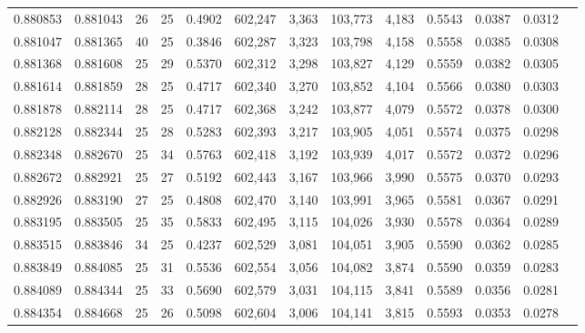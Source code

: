 \begin{tabular}{rrrrrrrrrrrrr}
0.880853 & 0.881043 &    26 &  25 &                                     0.4902 & 602,247 &   3,363 & 103,773 &   4,183 & 0.5543 & 0.0387 & 0.0312 \\
0.881047 & 0.881365 &    40 &  25 &                                     0.3846 & 602,287 &   3,323 & 103,798 &   4,158 & 0.5558 & 0.0385 & 0.0308 \\
0.881368 & 0.881608 &    25 &  29 &                                     0.5370 & 602,312 &   3,298 & 103,827 &   4,129 & 0.5559 & 0.0382 & 0.0305 \\
0.881614 & 0.881859 &    28 &  25 &                                     0.4717 & 602,340 &   3,270 & 103,852 &   4,104 & 0.5566 & 0.0380 & 0.0303 \\
0.881878 & 0.882114 &    28 &  25 &                                     0.4717 & 602,368 &   3,242 & 103,877 &   4,079 & 0.5572 & 0.0378 & 0.0300 \\
0.882128 & 0.882344 &    25 &  28 &                                     0.5283 & 602,393 &   3,217 & 103,905 &   4,051 & 0.5574 & 0.0375 & 0.0298 \\
0.882348 & 0.882670 &    25 &  34 &                                     0.5763 & 602,418 &   3,192 & 103,939 &   4,017 & 0.5572 & 0.0372 & 0.0296 \\
0.882672 & 0.882921 &    25 &  27 &                                     0.5192 & 602,443 &   3,167 & 103,966 &   3,990 & 0.5575 & 0.0370 & 0.0293 \\
0.882926 & 0.883190 &    27 &  25 &                                     0.4808 & 602,470 &   3,140 & 103,991 &   3,965 & 0.5581 & 0.0367 & 0.0291 \\
0.883195 & 0.883505 &    25 &  35 &                                     0.5833 & 602,495 &   3,115 & 104,026 &   3,930 & 0.5578 & 0.0364 & 0.0289 \\
0.883515 & 0.883846 &    34 &  25 &                                     0.4237 & 602,529 &   3,081 & 104,051 &   3,905 & 0.5590 & 0.0362 & 0.0285 \\
0.883849 & 0.884085 &    25 &  31 &                                     0.5536 & 602,554 &   3,056 & 104,082 &   3,874 & 0.5590 & 0.0359 & 0.0283 \\
0.884089 & 0.884344 &    25 &  33 &                                     0.5690 & 602,579 &   3,031 & 104,115 &   3,841 & 0.5589 & 0.0356 & 0.0281 \\
0.884354 & 0.884668 &    25 &  26 &                                     0.5098 & 602,604 &   3,006 & 104,141 &   3,815 & 0.5593 & 0.0353 & 0.0278 \\

\end{tabular}
